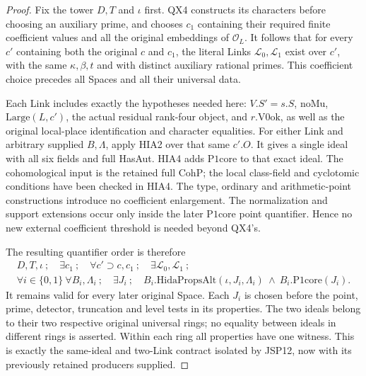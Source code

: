 \documentclass[11pt,a4paper]{article}
\numberwithin{equation}{section}
\theoremstyle{remark}\newtheorem{remark}[theorem]{Remark}
\begin{document}
\begin{proof}
Fix the tower \(D,T\) and \(\iota\) first.  QX4 constructs
its characters before choosing an auxiliary prime, and
chooses \(c_1\) containing their required finite coefficient
values and all the original embeddings of \(\mathcal O_L\).
It follows that for every \(c'\) containing both the original
\(c\) and \(c_1\), the literal Links
\(\mathcal L_0,\mathcal L_1\) exist over \(c'\), with
the same \(\kappa,\beta,t\) and with distinct auxiliary
rational primes.  This coefficient choice precedes all
Spaces and all their universal data.

Each Link includes exactly the hypotheses needed here:
\(V.S'=s.S\), \(\mathrm{noMu}\),
\(\mathrm{Large}(L,c')\), the actual residual rank-four
object, and \(r.\mathrm{V0ok}\), as well as the original
local-place identification and character equalities.
For either Link and arbitrary supplied \(B,\Lambda\),
apply HIA2 over that same \(c'.O\).  It gives a single
ideal with all six fields and full HasAut.  HIA4 adds
\(\mathrm{P1core}\) to that exact ideal.  The cohomological
input is the retained full \(\mathrm{CohP}\); the local
class-field and cyclotomic conditions have been checked
in HIA4.  The type, ordinary and arithmetic-point
constructions introduce no coefficient enlargement.
The normalization and support extensions occur only inside
the later \(\mathrm{P1core}\) point quantifier.  Hence no
new external coefficient threshold is needed beyond QX4's.

The resulting quantifier order is therefore
\[
 \begin{gathered}
 D,T,\iota\ ;\quad \exists c_1\ ;\quad
 \forall c'\supset c,c_1\ ;\quad
 \exists\mathcal L_0,\mathcal L_1\ ;\\
 \forall i\in\{0,1\}\ \forall B_i,\Lambda_i\ ;\quad
 \exists J_i\ ;\quad
 B_i.\mathrm{HidaPropsAlt}(\iota,J_i,\Lambda_i)
                    \ \wedge\ B_i.\mathrm{P1core}(J_i).
 \end{gathered}
 \tag{HIA.15}
\]
It remains valid for every later original Space.  Each
\(J_i\) is chosen before the point, prime, detector,
truncation and level tests in its properties.  The two
ideals belong to their two respective original universal
rings; no equality between ideals in different rings is
asserted.  Within each ring all properties have one witness.
This is exactly the same-ideal and two-Link contract isolated
by JSP12, now with its previously retained producers supplied.


\end{proof}
\end{document}
